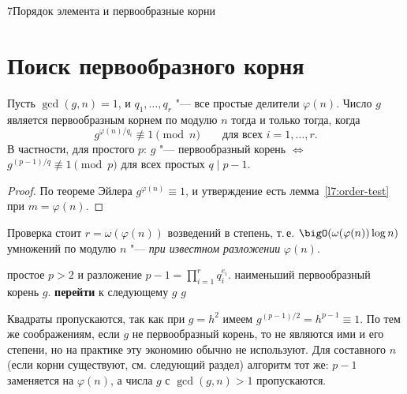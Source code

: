 \begin{lecture}{7}{Порядок элемента и первообразные корни}

\section{Поиск первообразного корня}

\begin{theorem}\label{l7:primroot-test}
Пусть $\gcd(g, n) = 1$, и $q_1, \dots, q_r$ "--- все простые делители $\varphi(n)$. Число $g$
является первообразным корнем по модулю $n$ тогда и только тогда, когда
\[
  g^{\varphi(n)/q_i} \not\equiv 1 \pmod n \qquad \text{для всех } i = 1, \dots, r.
\]
В частности, для простого $p$: $g$ "--- первообразный корень $\iff$ $g^{(p-1)/q} \not\equiv 1
\pmod p$ для всех простых $q \mid p - 1$.
\end{theorem}

\begin{proof}
По теореме Эйлера $g^{\varphi(n)} \equiv 1$, и утверждение есть лемма~\ref{l7:order-test} при
$m = \varphi(n)$.
\end{proof}

Проверка стоит $r = \omega(\varphi(n))$ возведений в степень, т.\,е.
$\bigO(\omega(\varphi(n)) \log n)$ умножений по модулю $n$ "--- \emph{при известном разложении}
$\varphi(n)$.

\begin{algorithm}\label{l7:alg-primroot}
\begin{algorithmic}[1]
\Require простое $p > 2$ и разложение $p - 1 = \prod_{i=1}^r q_i^{e_i}$.
\Ensure наименьший первообразный корень $g$.
   \State \textbf{перейти} к следующему $g$ 
  \EndIf
   \State \Return $g$ \EndIf
\EndFor
\end{algorithmic}
\end{algorithm}

Квадраты пропускаются, так как при $g = h^2$ имеем $g^{(p-1)/2} = h^{p-1} \equiv 1$. По тем же
соображениям, если $g$ не первообразный корень, то не являются ими и его степени, но на практике
эту экономию обычно не используют. Для составного $n$ (если корни существуют, см. следующий
раздел) алгоритм тот же: $p - 1$ заменяется на $\varphi(n)$, а числа $g$ с $\gcd(g, n) > 1$
пропускаются.


\end{lecture}
